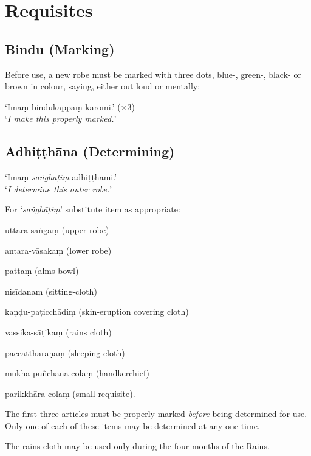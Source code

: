 \chapter{Requisites}

\section{Bindu (Marking)}

Before use, a new robe must be marked with three dots, blue-, green-, black- or
brown in colour, saying, either out loud or mentally:

‘Imaṃ bindukappaṃ karomi.’ (×3)\\
‘\emph{I make this properly marked.}’ 

\section{Adhiṭṭhāna (Determining)}


‘Imaṃ \emph{saṅghāṭiṃ} adhiṭṭhāmi.’\\
‘\emph{I determine this outer robe.}’

For ‘\emph{saṅghāṭiṃ}’ substitute item as appropriate:

\begin{packeditemize}

\item uttarā-saṅgaṃ (upper robe)
\item antara-vāsakaṃ (lower robe)
\item pattaṃ (alms bowl)
\item nisīdanaṃ (sitting-cloth)
\item kaṇḍu-paṭicchādiṃ (skin-eruption covering cloth)
\item vassika-sāṭikaṃ (rains cloth)
\item paccattharaṇaṃ (sleeping cloth)
\item mukha-puñchana-colaṃ (handkerchief)
\item parikkhāra-colaṃ (small requisite).

\end{packeditemize}

The first three articles must be properly marked \emph{before} being determined
for use. Only one of each of these items may be determined at any one time.

The rains cloth may be used only during the four months of the Rains.

